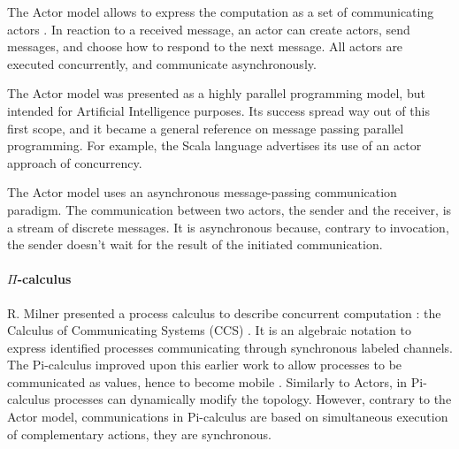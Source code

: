 The Actor model allows to express the computation as a set of communicating actors \cite{Hewitt1973a, Hewitt1977, Clinger1981}.
In reaction to a received message, an actor can create actors, send messages, and choose how to respond to the next message.
All actors are executed concurrently, and communicate asynchronously.

The Actor model was presented as a highly parallel programming model, but intended for Artificial Intelligence purposes.
Its success spread way out of this first scope, and it became a general reference on message passing parallel programming.
For example, the Scala language advertises its use of an actor approach of concurrency.


The Actor model uses an asynchronous message-passing communication paradigm.
The communication between two actors, the sender and the receiver, is a stream of discrete messages.
It is asynchronous because, contrary to invocation, the sender doesn't wait for the result of the initiated communication.

\paragraph{$\Pi$-calculus}

R. Milner presented a process calculus to describe concurrent computation : the Calculus of Communicating Systems (CCS) \cite{Milner1975, Milner1980}.
It is an algebraic notation to express identified processes communicating through synchronous labeled channels.
The Pi-calculus improved upon this earlier work to allow processes to be communicated as values, hence to become mobile \cite{Engberg1986,Milner1992a,Milner1992}.
Similarly to Actors, in Pi-calculus processes can dynamically modify the topology.
However, contrary to the Actor model, communications in Pi-calculus are based on simultaneous execution of complementary actions, they are synchronous.




